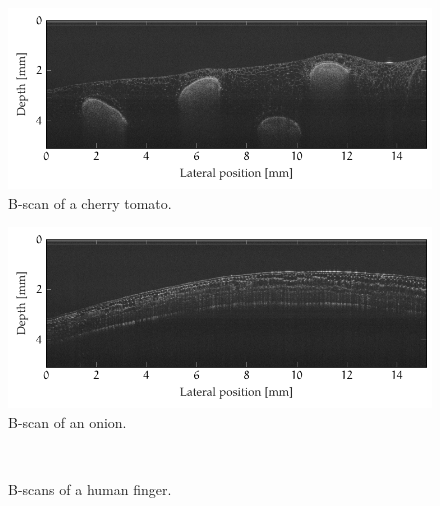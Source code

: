 \begin{figure}[hbt]
	\centering
	\includegraphics[width=0.9\linewidth]{gfx/ch4/axsun/no-bande/tomato-1}
	\caption{B-scan of a cherry tomato.}\label{fig:tomato-1}
\end{figure}

\begin{figure}[htb]
	\centering
	\includegraphics[width=0.9\linewidth]{gfx/ch4/axsun/no-bande/red-onion-2}
	\caption{B-scan of an onion.}\label{fig:red-onion-2}
\end{figure}	

\begin{figure}[htb]
	\myfloatalign
	 \quad
	 \\
	\caption{B-scans of a human finger.}\label{fig:human-finger}
\end{figure}


